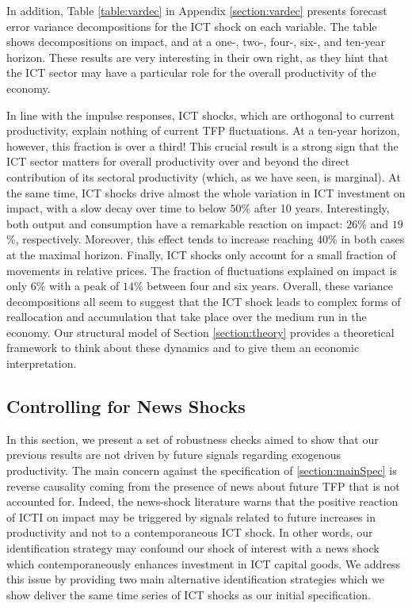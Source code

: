 \documentclass[12pt]{article}
\begin{document}
In addition, Table \ref{table:vardec} in Appendix \ref{section:vardec} presents forecast error variance decompositions for the ICT shock on each variable. The table shows decompositions on impact, and at a one-, two-, four-, six-, and ten-year horizon. These results are very interesting in their own right, as they hint that the ICT sector may have a particular role for the overall productivity of the economy.

In line with the impulse responses, ICT shocks, which are orthogonal to current productivity, explain nothing of current TFP fluctuations. At a ten-year horizon, however, this fraction is over a third! This crucial result is a strong sign that the ICT sector matters for overall productivity over and beyond the direct contribution of its sectoral productivity (which, as we have seen, is marginal). At the same time, ICT shocks drive almost the whole variation in ICT investment on impact, with a slow decay over time to below $50$\% after 10 years. Interestingly, both output and consumption have a remarkable reaction on impact: $26$\% and $19$\%, respectively. Moreover, this effect tends to increase reaching $40$\% in both cases at the maximal horizon. Finally, ICT shocks only account for a small fraction of movements in relative prices. The fraction of fluctuations explained on impact is only $6$\% with a peak of $14$\% between four and six years. Overall, these variance decompositions all seem to suggest that the ICT shock leads to complex forms of reallocation and accumulation that take place over the medium run in the economy. Our structural model of Section \ref{section:theory} provides a theoretical framework to think about these dynamics and to give them an economic interpretation.

\subsection{Controlling for News Shocks}

In this section, we present a set of robustness checks aimed to show that our previous results are not driven by future signals regarding exogenous productivity. The main concern against the specification of \ref{section:mainSpec} is reverse causality coming from the presence of news about future TFP that is not accounted for. Indeed, the news-shock literature warns that the positive reaction of ICTI on impact may be triggered by signals related to future increases in productivity and not to a contemporaneous ICT shock. In other words, our identification strategy may confound our shock of interest with a news shock which contemporaneously enhances investment in ICT capital goods. We address this issue by providing two main alternative identification strategies which we show deliver the same time series of ICT shocks as our initial specification. 
\end{document}
